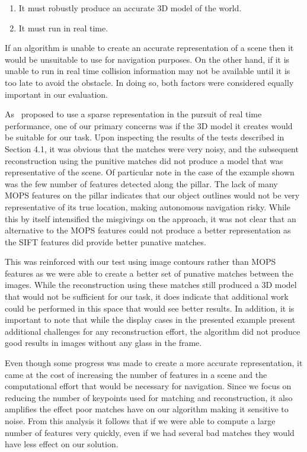 \documentclass{acmsiggraph}
\begin{document}
\begin{enumerate}
 \item It must robustly produce an accurate 3D model of the world.
 \item It must run in real time.
\end{enumerate}

If an algorithm is unable to create an accurate representation of a scene then it would be unsuitable to use for navigation
purposes.  On the other hand, if it is unable to run in real time collision information may not be available until it is too
late to avoid the obstacle.  In doing so, both factors were considered equally important in our evaluation.

As~\cite{lee2011} proposed to use a sparse representation in the pursuit of real time performance, one of our primary 
concerns was if the 3D model it creates would be suitable for our task.  Upon inspecting the results of the tests described
in Section 4.1, it was obvious that the matches were very noisy, and the subsequent reconstruction using the punitive matches
did not produce a model that was representative of the scene.  Of particular note in the case of the example shown was the 
few number of features detected along the pillar.  The lack of many MOPS features on the pillar indicates 
that our object outlines would not be very representative of its true location, making autonomous navigation risky.  While 
this by itself intensified the misgivings on the approach, it was not clear that an alternative to the MOPS features could 
not produce a better representation as the SIFT features did provide better punative matches.

This was reinforced with our test using image contours rather than MOPS features as we were able to create a better set of
punative matches between the images.  While the reconstruction using these matches still produced a 3D model that would not
be sufficient for our task, it does indicate that additional work could be performed in this space that would see better
results.  In addition, it is important to note that while the display cases in the presented example present additional
challenges for any reconstruction effort, the algorithm did not produce good results in images without any glass in the 
frame.  

Even though some progress was made to create a more accurate representation, it came at the cost of increasing the
number of features in a scene and the computational effort that would be necessary for navigation.  Since we focus on 
reducing the number of keypoints used for matching and reconstruction, it also amplifies the effect poor matches have on
our algorithm making it sensitive to noise.  From this analysis it follows that if we were able to compute a large number of
features very quickly, even if we had several bad matches they would have less effect on our solution.
\end{document}

